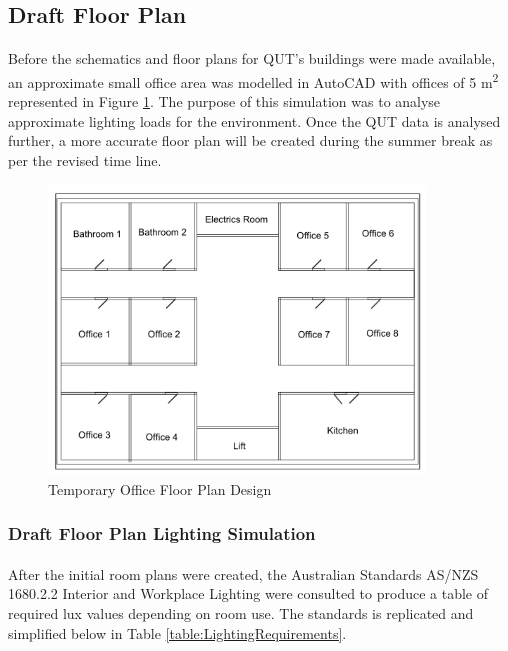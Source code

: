\newpage


\subsection{Draft Floor Plan}

\paragraph{}
Before the schematics and floor plans for QUT's buildings were made available, an approximate small office area was modelled in AutoCAD with offices of 5 \si{m^2} represented in Figure \ref{fig:RoughFloorplan}. The purpose of this simulation was to analyse approximate lighting loads for the environment. Once the QUT data is analysed further, a more accurate floor plan will be created during the summer break as per the revised time line.    

\begin{figure}[H]
\hfill\includegraphics[width = 100mm]{images/Rough_Floorplan}\hspace*{\fill}
\caption{Temporary Office Floor Plan Design} 
\label{fig:RoughFloorplan}
\end{figure} 

\subsubsection{Draft Floor Plan Lighting Simulation}

\paragraph{}
After the initial room plans were created, the Australian Standards AS/NZS 1680.2.2 Interior and Workplace Lighting were consulted to produce a table of required lux values depending on room use. The standards is replicated and simplified below in Table \ref{table:LightingRequirements}.

